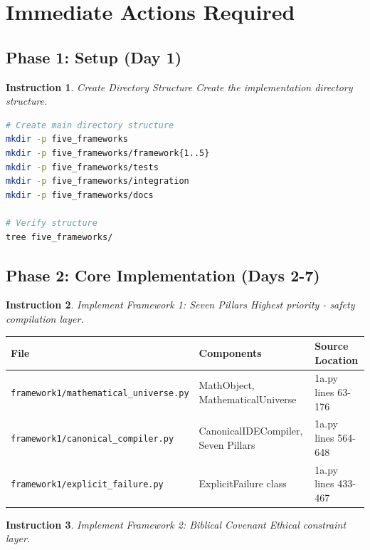 \documentclass[12pt]{article}
\newtheorem{instruction}{Instruction}
\begin{document}
\section{Immediate Actions Required}

\subsection{Phase 1: Setup (Day 1)}
\begin{instruction}{Create Directory Structure}
Create the implementation directory structure.
\end{instruction}

\begin{lstlisting}[language=bash]
# Create main directory structure
mkdir -p five_frameworks
mkdir -p five_frameworks/framework{1..5}
mkdir -p five_frameworks/tests
mkdir -p five_frameworks/integration
mkdir -p five_frameworks/docs

# Verify structure
tree five_frameworks/
\end{lstlisting}

\subsection{Phase 2: Core Implementation (Days 2-7)}

\begin{instruction}{Implement Framework 1: Seven Pillars}
Highest priority - safety compilation layer.
\end{instruction}

\begin{longtable}{|p{}|p{}|p{}|}
\hline
\textbf{File} & \textbf{Components} & \textbf{Source Location} \\
\hline
\texttt{framework1/mathematical\_universe.py} & MathObject, MathematicalUniverse & 1a.py lines 63-176 \\
\hline
\texttt{framework1/canonical\_compiler.py} & CanonicalIDECompiler, Seven Pillars & 1a.py lines 564-648 \\
\hline
\texttt{framework1/explicit\_failure.py} & ExplicitFailure class & 1a.py lines 433-467 \\
\hline
\end{longtable}

\begin{instruction}{Implement Framework 2: Biblical Covenant}
Ethical constraint layer.
\end{instruction}
\end{document}
